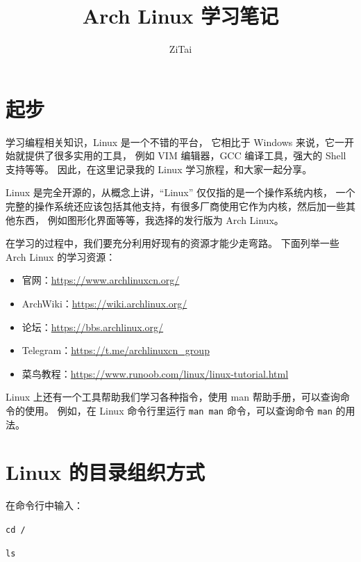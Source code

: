 \documentclass{ctexart}
\title{Arch Linux 学习笔记}
\author{ZiTai}
\date{\zhdate{2023/7/9}}
\begin{document}
\maketitle

\clearpage
\tableofcontents

\clearpage
\section{起步}
    学习编程相关知识，Linux 是一个不错的平台，
    它相比于 Windows 来说，它一开始就提供了很多实用的工具，
    例如 VIM 编辑器，GCC 编译工具，强大的 Shell 支持等等。
    因此，在这里记录我的 Linux 学习旅程，和大家一起分享。

    Linux 是完全开源的，从概念上讲，“Linux” 仅仅指的是一个操作系统内核，
    一个完整的操作系统还应该包括其他支持，有很多厂商使用它作为内核，然后加一些其他东西，
    例如图形化界面等等，我选择的发行版为 Arch Linux。

    在学习的过程中，我们要充分利用好现有的资源才能少走弯路。
    下面列举一些 Arch Linux 的学习资源：

    \begin{itemize}[labelindent=\parindent, leftmargin=*, align=left]
        \item 官网：\href{https://www.archlinuxcn.org/}{https://www.archlinuxcn.org/}
        \item ArchWiki：\href{https://wiki.archlinux.org/}{https://wiki.archlinux.org/}
        \item 论坛：\href{https://bbs.archlinux.org/}{https://bbs.archlinux.org/}
        \item Telegram：\href{https://t.me/archlinuxcn\_group}{https://t.me/archlinuxcn\_group}
        \item 菜鸟教程：\href{https://www.runoob.com/linux/linux-tutorial.html}{https://www.runoob.com/linux/linux-tutorial.html}
    \end{itemize}


    Linux 上还有一个工具帮助我们学习各种指令，使用 man 帮助手册，可以查询命令的使用。
    例如，在 Linux 命令行里运行 \texttt{man man} 命令，可以查询命令 \texttt{man} 的用法。

\section{Linux 的目录组织方式}
    在命令行中输入：

\begin{mybox}{}
    \texttt{cd /}%
    
    \texttt{ls}
\end{mybox}
\end{document}
